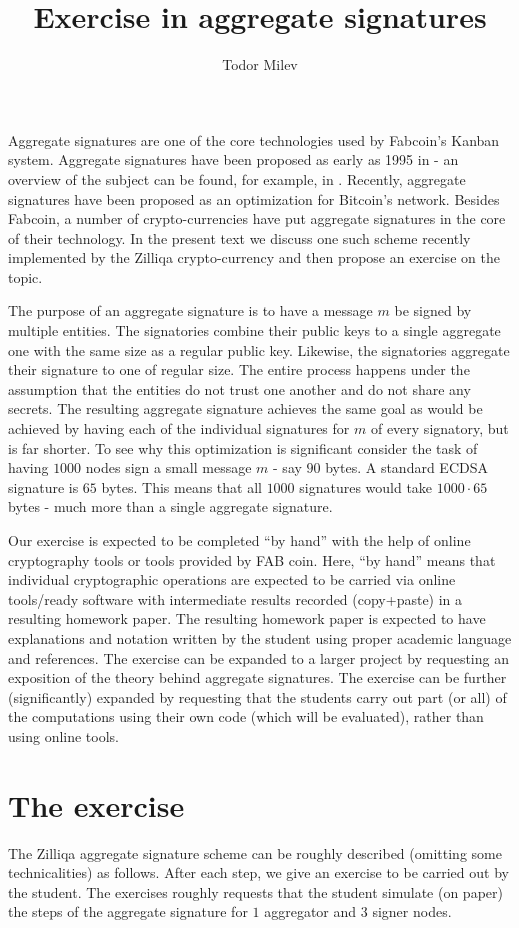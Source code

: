 \documentclass{article}
\title{Exercise in aggregate signatures}
\author{Todor Milev}
\begin{document}
\maketitle 
Aggregate signatures are one of the core technologies used by Fabcoin's Kanban system. Aggregate signatures have been proposed as early as 1995 in \cite{Horster1995} - an overview of the subject can be found, for example, in \cite{cryptoeprint:SimpleSchnorrMultisignatures}. Recently, aggregate signatures have been proposed as an optimization for Bitcoin's network. Besides Fabcoin, a number of crypto-currencies have put aggregate signatures in the core of their technology. In the present text we discuss one such scheme recently implemented by the Zilliqa crypto-currency and then propose an exercise on the topic. 

The purpose of an aggregate signature is to have a message $m$ be signed by multiple entities. The signatories combine their public keys to a single aggregate one with the same size as a regular public key. Likewise, the signatories aggregate their signature to one of regular size. The entire process happens under the assumption that the entities do not trust one another and do not share any secrets. The resulting aggregate signature achieves the same goal as would be achieved by having each of the individual signatures for $m$ of every signatory, but is far shorter. To see why this optimization is significant consider the task of having $1000$ nodes sign a small message $m$ - say $90$ bytes. A standard ECDSA signature is $65$ bytes. This means that all $1000$ signatures would take $1000\cdot 65$ bytes - much more than a single aggregate signature. 


Our exercise is expected to be completed ``by hand'' with the help of online cryptography tools or tools provided by FAB coin. Here, ``by hand'' means that individual cryptographic operations are expected to be carried via online tools/ready software with intermediate results recorded (copy+paste) in a resulting homework paper. The resulting homework paper is expected to have explanations and notation written by the student using proper academic language and references. The exercise can be expanded to a larger project by requesting an exposition of the theory behind aggregate signatures. The exercise can be further (significantly) expanded by requesting that the students carry out part (or all) of the computations using their own code (which will be evaluated), rather than using online tools.

\section{The exercise}
The Zilliqa aggregate signature scheme can be roughly described (omitting some technicalities) as follows. After each step, we give an exercise to be carried out by the student. The exercises roughly requests that the student simulate (on paper) the steps of the aggregate signature for $1$ aggregator and $3$ signer nodes. 
\end{document}
